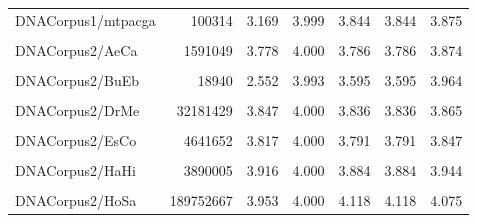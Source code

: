 \documentclass[12pt,twoside]{reedthesis}
\begin{document}
\begin{table}[!h]
{\begin{tabular}[t]{l|r|r|r|r|r|r}
\hline
\cellcolor{gray!6}{DNACorpus1/mpomtcg} & \cellcolor{gray!6}{186609} & \cellcolor{gray!6}{3.218} & \cellcolor{gray!6}{3.999} & \cellcolor{gray!6}{3.682} & \cellcolor{gray!6}{3.682} & \cellcolor{gray!6}{3.896}\\
\hline
DNACorpus1/mtpacga & 100314 & 3.169 & 3.999 & 3.844 & 3.844 & 3.875\\
\hline
\cellcolor{gray!6}{DNACorpus1/vaccg} & \cellcolor{gray!6}{191737} & \cellcolor{gray!6}{3.315} & \cellcolor{gray!6}{3.999} & \cellcolor{gray!6}{3.794} & \cellcolor{gray!6}{3.794} & \cellcolor{gray!6}{3.874}\\
\hline
DNACorpus2/AeCa & 1591049 & 3.778 & 4.000 & 3.786 & 3.786 & 3.874\\
\hline
\cellcolor{gray!6}{DNACorpus2/AgPh} & \cellcolor{gray!6}{43970} & \cellcolor{gray!6}{2.807} & \cellcolor{gray!6}{3.997} & \cellcolor{gray!6}{3.653} & \cellcolor{gray!6}{3.653} & \cellcolor{gray!6}{3.957}\\
\hline
DNACorpus2/BuEb & 18940 & 2.552 & 3.993 & 3.595 & 3.595 & 3.964\\
\hline
\cellcolor{gray!6}{DNACorpus2/DaRe} & \cellcolor{gray!6}{62565020} & \cellcolor{gray!6}{3.928} & \cellcolor{gray!6}{4.000} & \cellcolor{gray!6}{4.013} & \cellcolor{gray!6}{4.013} & \cellcolor{gray!6}{4.035}\\
\hline
DNACorpus2/DrMe & 32181429 & 3.847 & 4.000 & 3.836 & 3.836 & 3.865\\
\hline
\cellcolor{gray!6}{DNACorpus2/EnIn} & \cellcolor{gray!6}{26403087} & \cellcolor{gray!6}{3.918} & \cellcolor{gray!6}{4.000} & \cellcolor{gray!6}{3.893} & \cellcolor{gray!6}{3.893} & \cellcolor{gray!6}{3.928}\\
\hline
DNACorpus2/EsCo & 4641652 & 3.817 & 4.000 & 3.791 & 3.791 & 3.847\\
\hline
\cellcolor{gray!6}{DNACorpus2/GaGa} & \cellcolor{gray!6}{148532294} & \cellcolor{gray!6}{3.776} & \cellcolor{gray!6}{4.000} & \cellcolor{gray!6}{3.943} & \cellcolor{gray!6}{3.943} & \cellcolor{gray!6}{3.897}\\
\hline
DNACorpus2/HaHi & 3890005 & 3.916 & 4.000 & 3.884 & 3.884 & 3.944\\
\hline
\cellcolor{gray!6}{DNACorpus2/HePy} & \cellcolor{gray!6}{1667825} & \cellcolor{gray!6}{3.884} & \cellcolor{gray!6}{4.000} & \cellcolor{gray!6}{3.894} & \cellcolor{gray!6}{3.894} & \cellcolor{gray!6}{3.942}\\
\hline
DNACorpus2/HoSa & 189752667 & 3.953 & 4.000 & 4.118 & 4.118 & 4.075\\
\hline

\end{tabular}}
\end{table}
\end{document}

